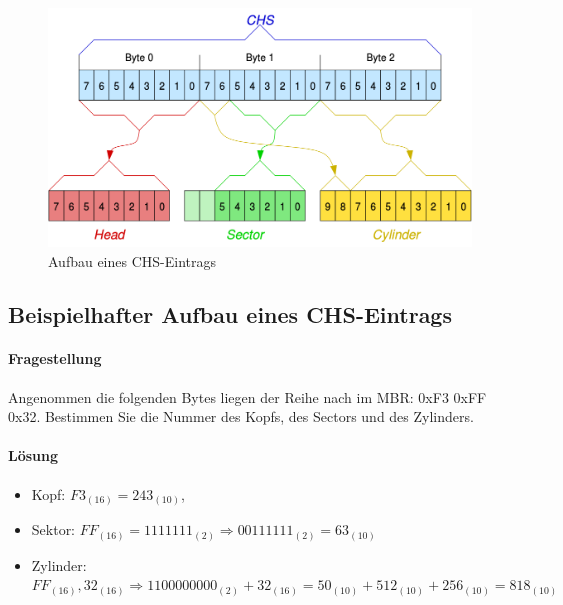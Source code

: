 \documentclass[11pt,a4paper]{article}
\begin{document}
\begin{figure}[h]
	\centering
	\includegraphics[scale=0.3]{images/chs_entry.png}
	\caption{Aufbau eines CHS-Eintrags}
	\label{fig:mbr_chsentry}
\end{figure}

\subsection{Beispielhafter Aufbau eines CHS-Eintrags}
\paragraph{Fragestellung}
Angenommen die folgenden Bytes liegen der Reihe nach
im MBR: 0xF3 0xFF 0x32. Bestimmen Sie die Nummer des Kopfs, des
Sectors und des Zylinders. 
\paragraph{Lösung}
\begin{itemize}
	\item Kopf: \(F3_{(16)} = 243_{(10)}\),
	\item Sektor: \(FF_{(16)} = 1111111_{(2)} \Rightarrow 00111111_{(2)} = 63_{(10)}\) 
	\item Zylinder: \(FF_{(16)}, 32_{(16)} \Rightarrow 1100000000_{(2)} + 32_{(16)} = 50_{(10)} + 512_{(10)} + 256_{(10)} = 818_{(10)}\)
\end{itemize}
\pagebreak{}
\end{document}
